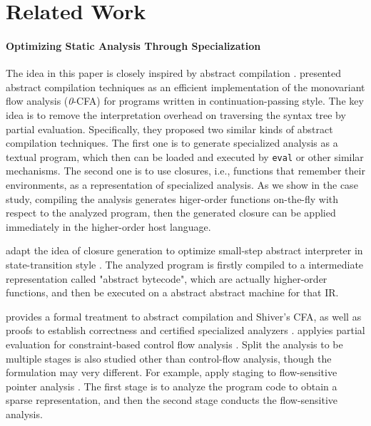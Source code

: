 \section{Related Work}

\paragraph{Optimizing Static Analysis Through Specialization}
The idea in this paper is closely inspired by abstract compilation \cite{Boucher:1996:ACN:647473.727587}.
\citeauthor{Boucher:1996:ACN:647473.727587} presented abstract compilation
techniques as an efficient implementation of the monovariant flow analysis 
(\textit{0}-CFA) for programs written in continuation-passing style. 
The key idea is to remove the interpretation overhead on traversing the syntax 
tree by partial evaluation. Specifically, they proposed two similar kinds of abstract compilation techniques.
The first one is to generate specialized analysis as a textual program, which then
can be loaded and executed by \texttt{eval} or other similar mechanisms. 
The second one is to use closures, i.e., functions that remember their environments, 
as a representation of specialized analysis. As we show in the case study,
compiling the analysis generates higer-order functions on-the-fly with respect to 
the analyzed program, then the generated closure can be applied immediately in the 
higher-order host language.

\citeauthor{Johnson:2013:OAA:2500365.2500604} adapt the idea of closure generation 
to optimize small-step abstract interpreter in state-transition style \cite{Johnson:2013:OAA:2500365.2500604}.
The analyzed program is firstly compiled to a intermediate representation called 
"abstract bytecode", which are actually higher-order functions, and then be executed 
on a abstract abstract machine for that IR.

\citet{damian1999partial} provides a formal treatment to abstract compilation and Shiver's CFA, 
as well as proofs to establish correctness and certified specialized analyzers \cite{damian1999partial}.
\citeauthor{amtoft1999partial} applyies partial evaluation for constraint-based 
control flow analysis \cite{amtoft1999partial}.
Split the analysis to be multiple stages is also studied other than control-flow analysis,
though the formulation may very different.
For example, \citeauthor{DBLP:conf/cgo/HardekopfL11} apply staging to flow-sensitive pointer 
analysis \cite{DBLP:conf/cgo/HardekopfL11}. The first stage is to analyze the program code to 
obtain a sparse representation, and then the second stage conducts the flow-sensitive analysis. 

